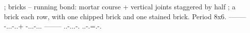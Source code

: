 ; bricks -- running bond: mortar course + vertical joints staggered by half
; a brick each row, with one chipped brick and one stained brick. Period 8x6.
--------
-...-..+
-...-...
--------
..-...-.
..-.=.-.
